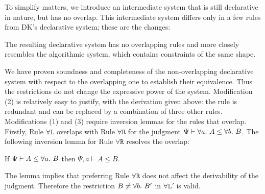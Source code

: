 To simplify matters, we introduce an intermediate system that is still declarative
in nature, but has no overlap. This intermediate system differs only in a few 
rules from DK's declarative system; these are the changes:
The resulting declarative system has no overlapping rules
and more closely resembles the algorithmic system,
which contains constraints of the same shape.

We have proven soundness and completeness of the non-overlapping declarative
system with respect to the overlapping one to establish their equivalence.
Thus the restrictions do not change the expressive power of the system.
Modification (2) is relatively easy to justify, with the derivation given above:
the rule is redundant and can be replaced by a combination of three other rules.
Modifications (1) and (3) require inversion lemmas for the rules that overlap.
Firstly, Rule $\mathtt{\forall L}$ overlaps with Rule $\mathtt{\forall R}$ for the judgment
$\Psi \vdash \all A \le \all[b]B$.
The following inversion lemma for Rule $\mathtt{\forall R}$ resolves the overlap:
\begin{lemma}\label{lem:inv_allR}
If $\Psi \vdash A \le \all B$ then $\Psi, a \vdash A \le B$.
\end{lemma}
The lemma implies that preferring Rule $\mathtt{\forall R}$ does not affect the derivability of the judgment.
Therefore the restriction $B \neq \all[b]B'$ in $\mathtt{\forall L'}$ is valid.

